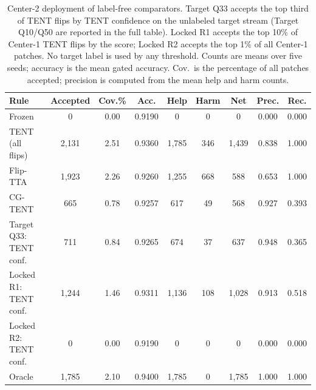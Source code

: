 \begin{table}[t]
\centering
\small
\setlength{\tabcolsep}{4pt}
\caption{Center-2 deployment of label-free comparators. Target Q33 accepts the top third of TENT flips by TENT confidence on the unlabeled target stream (Target Q10/Q50 are reported in the full table). Locked R1 accepts the top 10\% of Center-1 TENT flips by the score; Locked R2 accepts the top 1\% of all Center-1 patches. No target label is used by any threshold. Counts are means over five seeds; accuracy is the mean gated accuracy. Cov.\ is the percentage of all patches accepted; precision is computed from the mean help and harm counts.}
\label{tab:deployment-locked}
\begin{tabular}{@{}lcccccccc@{}}
\toprule
Rule & Accepted & Cov.\% & Acc. & Help & Harm & Net & Prec. & Rec. \\
\midrule
Frozen & 0 & 0.00 & 0.9190 & 0 & 0 & 0 & 0.000 & 0.000 \\
TENT (all flips) & 2{,}131 & 2.51 & 0.9360 & 1{,}785 & 346 & 1{,}439 & 0.838 & 1.000 \\
Flip-TTA & 1{,}923 & 2.26 & 0.9260 & 1{,}255 & 668 & 588 & 0.653 & 1.000 \\
CG-TENT & 665 & 0.78 & 0.9257 & 617 & 49 & 568 & 0.927 & 0.393 \\
Target Q33: TENT conf. & 711 & 0.84 & 0.9265 & 674 & 37 & 637 & 0.948 & 0.365 \\
Locked R1: TENT conf. & 1{,}244 & 1.46 & 0.9311 & 1{,}136 & 108 & 1{,}028 & 0.913 & 0.518 \\
Locked R2: TENT conf. & 0 & 0.00 & 0.9190 & 0 & 0 & 0 & 0.000 & 0.000 \\
Oracle & 1{,}785 & 2.10 & 0.9400 & 1{,}785 & 0 & 1{,}785 & 1.000 & 1.000 \\
\bottomrule
\end{tabular}
\end{table}
